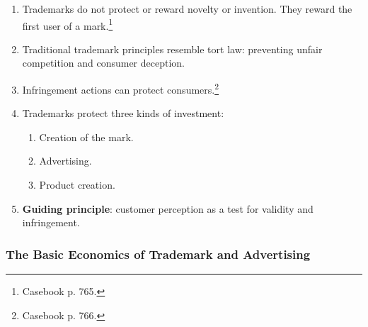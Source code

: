 \begin{enumerate}
    \item Trademarks do not protect or reward novelty or invention. They 
    reward the first user of a mark.\footnote{Casebook p. 765.}
    \item Traditional trademark principles resemble tort law: preventing 
    unfair competition and consumer deception.
    \item Infringement actions can protect consumers.\footnote{Casebook p. 
    766.}
    \item Trademarks protect three kinds of investment:
    \begin{enumerate}
        \item Creation of the mark.
        \item Advertising.
        \item Product creation.
    \end{enumerate}
    \item \textbf{Guiding principle}: customer perception as a test for 
    validity and infringement.
\end{enumerate}

\subsubsection{The Basic Economics of Trademark and Advertising}

